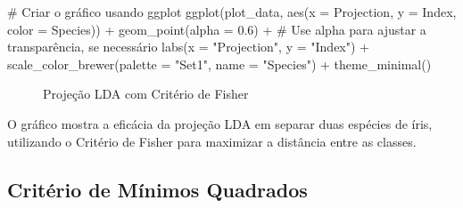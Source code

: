 \documentclass[
  a4paperpaper,
]{article}
\newenvironment{Shaded}{\begin{snugshade}}{\end{snugshade}}
\newcommand{\AttributeTok}[1]{\textcolor[rgb]{0.40,0.45,0.13}{#1}}
\newcommand{\CommentTok}[1]{\textcolor[rgb]{0.37,0.37,0.37}{#1}}
\newcommand{\FloatTok}[1]{\textcolor[rgb]{0.68,0.00,0.00}{#1}}
\newcommand{\FunctionTok}[1]{\textcolor[rgb]{0.28,0.35,0.67}{#1}}
\newcommand{\NormalTok}[1]{\textcolor[rgb]{0.00,0.23,0.31}{#1}}
\newcommand{\SpecialCharTok}[1]{\textcolor[rgb]{0.37,0.37,0.37}{#1}}
\newcommand{\StringTok}[1]{\textcolor[rgb]{0.13,0.47,0.30}{#1}}
\begin{document}
\begin{Shaded}
\begin{Highlighting}[]
\CommentTok{\# Criar o gráfico usando ggplot}
\FunctionTok{ggplot}\NormalTok{(plot\_data, }\FunctionTok{aes}\NormalTok{(}\AttributeTok{x =}\NormalTok{ Projection, }\AttributeTok{y =}\NormalTok{ Index, }\AttributeTok{color =}\NormalTok{ Species)) }\SpecialCharTok{+}
  \FunctionTok{geom\_point}\NormalTok{(}\AttributeTok{alpha =} \FloatTok{0.6}\NormalTok{) }\SpecialCharTok{+}  \CommentTok{\# Use alpha para ajustar a transparência, se necessário}
  \FunctionTok{labs}\NormalTok{(}\AttributeTok{x =} \StringTok{"Projection"}\NormalTok{, }\AttributeTok{y =} \StringTok{"Index"}\NormalTok{) }\SpecialCharTok{+}
  \FunctionTok{scale\_color\_brewer}\NormalTok{(}\AttributeTok{palette =} \StringTok{"Set1"}\NormalTok{, }\AttributeTok{name =} \StringTok{"Species"}\NormalTok{) }\SpecialCharTok{+}
  \FunctionTok{theme\_minimal}\NormalTok{()}
\end{Highlighting}
\end{Shaded}

\begin{figure}[H]


\caption{\label{fig-lda}Projeção LDA com Critério de Fisher}

\end{figure}%

O gráfico mostra a eficácia da projeção LDA em separar duas espécies de
íris, utilizando o Critério de Fisher para maximizar a distância entre
as classes.

\subsection{Critério de Mínimos
Quadrados}\label{crituxe9rio-de-muxednimos-quadrados}
\end{document}
